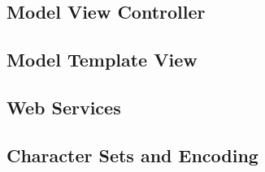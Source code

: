 \subsection{Model View Controller}
	
\subsection{Model Template View}
	
\subsection{Web Services}
	
\subsection{Character Sets and Encoding}
	